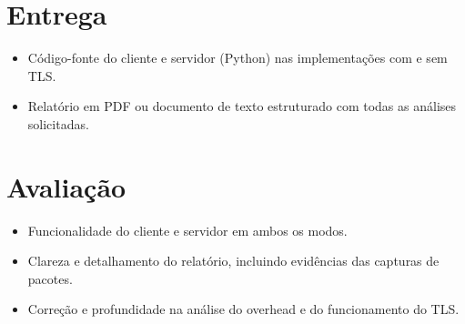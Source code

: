\section*{Entrega}
\begin{itemize}
    \item Código-fonte do cliente e servidor (Python) nas implementações com e sem TLS.
    \item Relatório em PDF ou documento de texto estruturado com todas as análises solicitadas.
\end{itemize}

\section*{Avaliação}
\begin{itemize}
    \item Funcionalidade do cliente e servidor em ambos os modos.
    \item Clareza e detalhamento do relatório, incluindo evidências das capturas de pacotes.
    \item Correção e profundidade na análise do overhead e do funcionamento do TLS.
\end{itemize}

